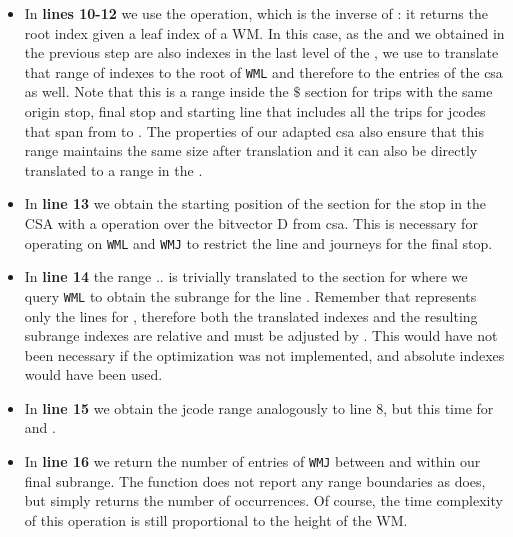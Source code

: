 \begin{itemize}
        \item In \textbf{lines 10-12} we use the  operation, which is the inverse of : it returns the root index given a leaf index of a WM. In this case, as the  and  we obtained in the previous step are also indexes in the last level of the , we use  to translate that range of indexes to the root of \texttt{WML} and therefore to the entries of the \gls{csa} as well. Note that this is a range inside the $\$$ section for trips with the same origin stop, final stop and starting line that includes all the trips for jcodes that span from  to . The properties of our adapted \gls{csa} also ensure that this range maintains the same size after translation and it can also be directly translated to a range in the .
        
        \item In \textbf{line 13} we obtain the starting position of the section for the stop  in the CSA with a  operation over the bitvector D from \gls{csa}. This is necessary for operating on \texttt{WML} and \texttt{WMJ} to restrict the line and journeys for the final stop.
        
        \item In \textbf{line 14} the range $..$ is trivially translated to the section for  where we query \texttt{WML} to obtain the subrange for the line . Remember that  represents only the lines for , therefore both the translated indexes and the resulting subrange indexes are relative and must be adjusted by . This would have not been necessary if the optimization was not implemented, and absolute indexes would have been used. 
        
        \item In \textbf{line 15} we obtain the jcode range analogously to line 8, but this time for  and .
        
        \item In \textbf{line 16} we return the number of entries of \texttt{WMJ} between  and  within our final subrange. The function  does not report any range boundaries as  does, but simply returns the number of occurrences. Of course, the time complexity of this operation is still proportional to the height of the WM.
    \end{itemize}
    
